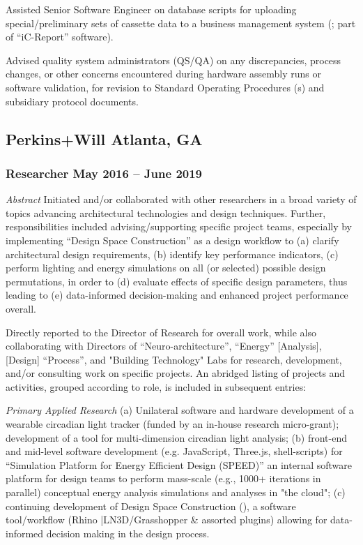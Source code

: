 \documentclass[letterpaper, oneside, 10pt]{article}
\begin{document}
Assisted Senior Software Engineer on  database scripts for uploading
special/preliminary sets of cassette data to a business management system
(; part of ``iC-Report'' software).

Advised quality system administrators (QS/QA) on any discrepancies, process
changes, or other concerns encountered during hardware assembly runs or
software validation, for revision to Standard Operating Procedures (s)
and subsidiary protocol documents.



\subsection*{Perkins+Will\DotSep{0.25em} Atlanta, GA}
\subsubsection*{Researcher\DotSep{0.25em} May 2016 -- June 2019}


\textit{Abstract}\DotSep{0.25em} Initiated and/or collaborated with other
researchers in a broad variety of topics advancing architectural technologies
and design techniques. Further, responsibilities included advising/supporting
specific project teams, especially by implementing ``Design Space
Construction'' as a design workflow to (a) clarify architectural design
requirements, (b) identify key performance indicators, (c) perform lighting and
energy simulations on all (or selected) possible design permutations, in order
to (d) evaluate effects of specific design parameters, thus leading to (e)
data-informed decision-making and enhanced project performance overall.

Directly reported to the Director of Research for overall work, while also
collaborating with Directors of ``Neuro-architecture'', ``Energy'' [Analysis],
[Design] ``Process'', and "Building Technology" Labs for research, development,
and/or consulting work on specific projects. An abridged listing of projects
and activities, grouped according to role, is included in subsequent entries:

\textit{Primary Applied Research}\DotSep{0.25em} (a) Unilateral software and
hardware development of a wearable circadian light tracker (funded by an
in-house research micro-grant); development of a tool for multi-dimension
circadian light analysis; (b) front-end and mid-level software development
(e.g. JavaScript, Three.js, shell-scripts) for ``Simulation Platform for Energy
Efficient Design (SPEED)'' an internal software platform for design teams to
perform mass-scale (e.g., 1000+ iterations in parallel) conceptual energy
analysis simulations and analyses in "the cloud"; (c) continuing development of
Design Space Construction (), a software tool/workflow (Rhino
|LN{3D}/Grasshopper \& assorted plugins) allowing for data-informed decision
making in the design process.
\end{document}
